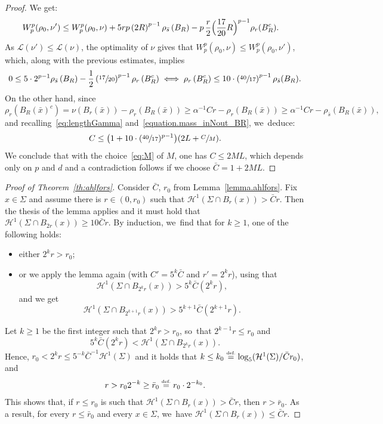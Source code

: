 \documentclass[10pt]{amsart}
\theoremstyle{definition}
\newcommand{\eqdef}{\ensuremath{\stackrel{\mbox{\upshape\tiny def.}}{=}}}
\newcommand\cH{\mathcal{H}}
\begin{document}
\begin{proof}
We get:
\begin{align*}
W_p^p(\rho_0, \nu')
&\le
W_p^p(\rho_0, \nu)
+
5rp
\left(2R\right)^{p-1}\rho_{\bar s}\left(B_R\right)
-
p\,\frac{r}{2}
\Bigl(\frac{17}{20}R\Bigr)^{p-1}\rho_r(B_R^c).
\end{align*}
As $\mathcal{L}(\nu') \le \mathcal{L}(\nu)$, the optimality of $\nu$ gives that $W_p^p(\rho_0, \nu) \le W_p^p(\rho_0, \nu')$, which, along with the previous estimates, implies
\[
0 \le
5\cdot
2^{p-1}\rho_{\bar s}\left(B_R\right)
-
\frac{1}{2}
\left(\sfrac{17}{20}\right)^{p-1}\rho_r\left(B_R^c\right)
\iff
\rho_r\left(B_R^c\right)\le 10\cdot \left(\sfrac{40}{17}\right)^{p-1}
\rho_{\bar s}(B_R).
\]
On the other hand, since
\begin{equation*}
\rho_{r}\left(B_R(\bar x)^c\right) = \nu(B_r(\bar x))- \rho_r(B_R(\bar x)) \ge \alpha^{-1}Cr - \rho_r(B_R(\bar x))
\ge \alpha^{-1}Cr - \rho_{\bar s}(B_R(\bar x)),
\end{equation*}
and recalling~\eqref{eq:lengthGamma} and~\eqref{equation.mass_inNout_BR}, we~deduce:
\[
C
\le \bigl( 1+10\cdot(\sfrac{40}{17})^{p-1} \bigr)(2L+\sfrac{C}{M}).
\]
We conclude that with the choice~\eqref{eq:M} of $M$,
one has $C\le 2M L$, which depends only on $p$ and $d$ and a contradiction follows
if we choose $\bar C=1+2M L$.
\end{proof}

\begin{proof}[Proof of Theorem~\ref{th:ahlfors}]
Consider $\bar C$, $r_0$ from Lemma~\ref{lemma.ahlfors}. Fix $x\in \Sigma$ and assume
there is $r\in (0,r_0)$ such that $\cH^1(\Sigma\cap B_r(x)) > \bar Cr$. Then the thesis of the lemma applies and it must hold that $\cH^1(\Sigma\cap B_{2r}(x)) \ge 10\bar Cr$. By induction, we~find that for $k\ge 1$, one of the following holds:
\begin{itemize}
\item either $2^k r > r_0$;
\item or we apply the lemma again (with $C'=5^k\bar C$ and $r'=2^kr$), using that
\[
\cH^1(\Sigma\cap B_{2^{k}r}(x)) > 5^{k}\bar C(2^k r),
\]
and we get
\[
\cH^1(\Sigma\cap B_{2^{k+1}r}(x)) > 5^{k+1}\bar C(2^{k+1}r).
\]
\end{itemize}

Let $k\ge 1$ be the first integer such that $2^k r> r_0$, so~that $2^{k-1}r\le r_0$
and
\[
5^{k}\bar C(2^{k}r) < \cH^1(\Sigma\cap B_{2^{k}r}(x)).
\]
Hence, $r_0 < 2^kr \le 5^{-k}\bar C^{-1}\cH^1(\Sigma)$ and it holds that $k\le k_0\eqdef \log_5 (\cH^1(\Sigma)/\bar C r_0)$,
and
\[
r > r_0 2^{-k} \ge \bar r_0 \eqdef r_0 \cdot 2^{-k_0}.
\]
This shows that, if $r \le r_0$ is such that $\cH^1(\Sigma\cap B_r(x)) > \bar Cr$, then $r>\bar r_0$. As a result, for every $r\le \bar r_0$ and every $x\in\Sigma$, we~have $\cH^1(\Sigma\cap B_r(x))\le \bar Cr$.
\end{proof}
\end{document}
